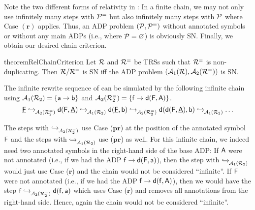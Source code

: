 Note the two different forms of relativity in :
In a finite chain,
we may not only use infinitely many steps with $\mathcal{P}^{=}$ but also infinitely many steps
with $\mathcal{P}$ where Case $(\mathbf{r})$ applies.  
Thus, an ADP problem $(\mathcal{P},\mathcal{P}^{=})$
without annotated symbols or without any main ADPs (i.e., where $\mathcal{P} = \varnothing$) is obviously SN.
Finally, we obtain our desired chain criterion.

\begin{restatable}{theorem}{RelChainCriterion}\label{theorem:relative-chain-crit}
    Let $\mathcal{R}$ and $\mathcal{R}^{=}$ be TRSs such that $\mathcal{R}^{=}$ is non-duplicating.
    Then $\mathcal{R} / \mathcal{R}^{=}$ is SN iff the ADP problem $(\mathcal{A}_{1}(\mathcal{R}), \mathcal{A}_{2}(\mathcal{R}^{=}))$ is SN.
\end{restatable}

\begin{example}\label{ex:ADPs-for-redex-creation-1}
    The infinite rewrite sequence of  can be simulated by
    the following infinite chain  using $\mathcal{A}_{1}(\mathcal{R}_2) = \{ \mathsf{a}
    \to \mathsf{b}\}$
    and $\mathcal{A}_{2}(\mathcal{R}_2^{=}) = \{\mathsf{f} \to
    \mathsf{d}(\mathsf{F},\mathsf{A})\}$.
    \[\underline{\tF}
    \tored{}{}{\ADPairBase{\R_2^{=}}} \tc(\tF,\underline{\tA}) \tored{}{}{\ADPairMain{\R_2}} \tc(\underline{\tF},\tb)
    \tored{}{}{\ADPairBase{\R_2^{=}}} \tc(\tc(\tF,\underline{\tA}),\tb) \tored{}{}{\ADPairMain{\R_2}}
    \ldots\]

    The steps with $\mathrel{ \xhookrightarrow{{}_{\scriptstyle }} \!\!{}^{}_{\mathcal{A}_{2}(\mathcal{R}_2^{=})} }$ use Case
    ($\mathbf{pr}$) at the position of the annotated symbol $\mathsf{F}$
    and the steps 
    with $\mathrel{ \xhookrightarrow{{}_{\scriptstyle }} \!\!{}^{}_{\mathcal{A}_{1}(\mathcal{R}_2)} }$ use ($\mathbf{pr}$) as well.
    For this infinite chain, we indeed need 
    two annotated symbols in the right-hand side of the base ADP: If $\mathsf{A}$ were not annotated (i.e., if we had the ADP
    $\mathsf{f} \to
    \mathsf{d}(\mathsf{F},\mathsf{a})$), then the step with 
    $\mathrel{ \xhookrightarrow{{}_{\scriptstyle }} \!\!{}^{}_{\mathcal{A}_{1}(\mathcal{R}_2)} }$ would just use Case ($\mathbf{r}$) and the chain would
    not be considered ``infinite''. If $\mathsf{F}$ were not annotated
    (i.e., if we had the ADP
    $\mathsf{f} \to
    \mathsf{d}(\mathsf{f},\mathsf{A})$), then we would have the step
     $\mathsf{f}
    \mathrel{ \xhookrightarrow{{}_{\scriptstyle }} \!\!{}^{}_{\mathcal{A}_{2}(\mathcal{R}_2^{=})} } \mathsf{d}(\mathsf{f},\mathsf{a})$ which uses
    Case ($\mathbf{r}$)
    and removes all
    annotations from the right-hand side. Hence, again the chain would not be considered ``infinite''.
\end{example}


